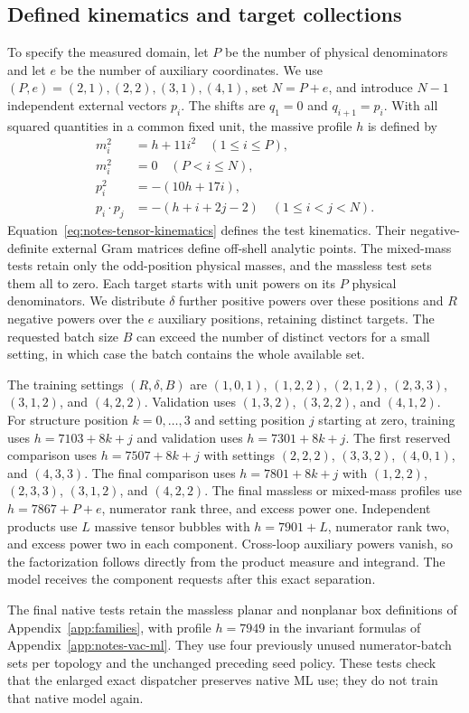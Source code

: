 \subsection{Defined kinematics and target collections}
To specify the measured domain, let $P$ be the number of physical denominators and let $e$ be the number of auxiliary coordinates. We use $(P,e)=(2,1),(2,2),(3,1),(4,1)$, set $N=P+e$, and introduce $N-1$ independent external vectors $p_i$. The shifts are $q_1=0$ and $q_{i+1}=p_i$. With all squared quantities in a common fixed unit, the massive profile $h$ is defined by
\begin{align}
 m_i^2&=h+11i^2\quad(1\leq i\leq P),\\
 m_i^2&=0\quad(P<i\leq N),\\
 p_i^2&=-(10h+17i),\\
 p_i\cdot p_j&=-(h+i+2j-2)\quad(1\leq i<j<N).
 \label{eq:notes-tensor-kinematics}
\end{align}
Equation~\eqref{eq:notes-tensor-kinematics} defines the test kinematics. Their negative-definite external Gram matrices define off-shell analytic points. The mixed-mass tests retain only the odd-position physical masses, and the massless test sets them all to zero. Each target starts with unit powers on its $P$ physical denominators. We distribute $\delta$ further positive powers over these positions and $R$ negative powers over the $e$ auxiliary positions, retaining distinct targets. The requested batch size $B$ can exceed the number of distinct vectors for a small setting, in which case the batch contains the whole available set.

The training settings $(R,\delta,B)$ are $(1,0,1)$, $(1,2,2)$, $(2,1,2)$, $(2,3,3)$, $(3,1,2)$, and $(4,2,2)$. Validation uses $(1,3,2)$, $(3,2,2)$, and $(4,1,2)$. For structure position $k=0,\ldots,3$ and setting position $j$ starting at zero, training uses $h=7103+8k+j$ and validation uses $h=7301+8k+j$. The first reserved comparison uses $h=7507+8k+j$ with settings $(2,2,2)$, $(3,3,2)$, $(4,0,1)$, and $(4,3,3)$. The final comparison uses $h=7801+8k+j$ with $(1,2,2)$, $(2,3,3)$, $(3,1,2)$, and $(4,2,2)$. The final massless or mixed-mass profiles use $h=7867+P+e$, numerator rank three, and excess power one. Independent products use $L$ massive tensor bubbles with $h=7901+L$, numerator rank two, and excess power two in each component. Cross-loop auxiliary powers vanish, so the factorization follows directly from the product measure and integrand. The model receives the component requests after this exact separation.

The final native tests retain the massless planar and nonplanar box definitions of Appendix~\ref{app:families}, with profile $h=7949$ in the invariant formulas of Appendix~\ref{app:notes-vac-ml}. They use four previously unused numerator-batch sets per topology and the unchanged preceding seed policy. These tests check that the enlarged exact dispatcher preserves native ML use; they do not train that native model again.
